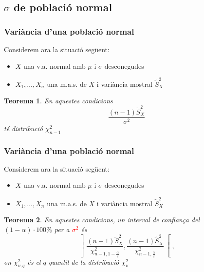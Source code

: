 \documentclass[12pt,t]{beamer}
\newcommand{\red}[1]{\textcolor{red}{#1}}
\theoremstyle{plain}
\newtheorem{teorema}{Teorema}
\theoremstyle{definition}
\begin{document}
\subsection{$\sigma$ de població normal}
\begin{frame}
\frametitle{Variància d'una població normal}


Considerem ara la situació següent:
\begin{itemize}
\item  $X$ una v.a. normal amb $\mu$ i $\sigma$ desconegudes

\item $X_1,\ldots,X_n$ una m.a.s. de $X$ i variància mostral $\widetilde{S}_X^2$
\end{itemize}


\begin{teorema}
En aquestes condicions
$$
\frac{(n-1) \tilde{S}_{X}^2}{\sigma^2}
$$
té distribució $\chi^2_{n-1}$
\end{teorema}
\end{frame}

\begin{frame}
\frametitle{Variància d'una població normal}


Considerem ara la situació següent:
\begin{itemize}
\item  $X$ una v.a. normal amb $\mu$ i $\sigma$ desconegudes

\item $X_1,\ldots,X_n$ una m.a.s. de $X$ i variància mostral $\widetilde{S}_X^2$
\end{itemize}


\begin{teorema}
En aquestes condicions,  un interval  de confiança del $(1-\alpha)\cdot 100\%$ per a \red{$\sigma^2$}
és  
$$
\left] \frac{(n-1)\widetilde{S}_{X}^2}{\chi_{n-1,1-\frac{\alpha}{2}}^2},
\frac{(n-1)\widetilde{S}_{X}^2}{\chi_{n-1,\frac{\alpha}{2}}^2}
\right[,
$$
on $\chi_{\nu,q}^2$ és el $q$-quantil de la distribució $\chi_{\nu}^2$
\end{teorema}
\end{frame}
\end{document}
